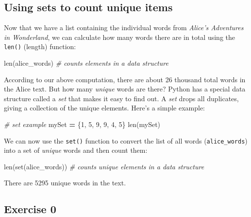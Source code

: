 \documentclass[]{book}
\newenvironment{Shaded}{\begin{snugshade}}{\end{snugshade}}
\newcommand{\BuiltInTok}[1]{#1}
\newcommand{\CommentTok}[1]{\textcolor[rgb]{0.56,0.35,0.01}{\textit{#1}}}
\newcommand{\DecValTok}[1]{\textcolor[rgb]{0.00,0.00,0.81}{#1}}
\newcommand{\NormalTok}[1]{#1}
\newcommand{\OperatorTok}[1]{\textcolor[rgb]{0.81,0.36,0.00}{\textbf{#1}}}
\begin{document}
\hypertarget{using-sets-to-count-unique-items}{%
\subsection{Using sets to count unique items}\label{using-sets-to-count-unique-items}}

Now that we have a list containing the individual words from \emph{Alice's Adventures in Wonderland}, we can calculate how many words there are in total using the \texttt{len()} (length) function:

\begin{Shaded}
\begin{Highlighting}[]
\BuiltInTok{len}\NormalTok{(alice_words) }\CommentTok{# counts elements in a data structure}
\end{Highlighting}
\end{Shaded}

According to our above computation, there are about 26 thousand total words in the Alice text. But how many \emph{unique} words are there? Python has a special data structure called a \emph{set} that makes it easy to find out. A \emph{set} drops all duplicates, giving a collection of the unique elements. Here's a simple example:

\begin{Shaded}
\begin{Highlighting}[]
\CommentTok{# set example}
\NormalTok{mySet }\OperatorTok{=}\NormalTok{ \{}\DecValTok{1}\NormalTok{, }\DecValTok{5}\NormalTok{, }\DecValTok{9}\NormalTok{, }\DecValTok{9}\NormalTok{, }\DecValTok{4}\NormalTok{, }\DecValTok{5}\NormalTok{\}}
\BuiltInTok{len}\NormalTok{(mySet)}
\end{Highlighting}
\end{Shaded}

We can now use the \texttt{set()} function to convert the list of all words (\texttt{alice\_words}) into a set of \emph{unique} words and then count them:

\begin{Shaded}
\begin{Highlighting}[]
\BuiltInTok{len}\NormalTok{(}\BuiltInTok{set}\NormalTok{(alice_words)) }\CommentTok{# counts unique elements in a data structure}
\end{Highlighting}
\end{Shaded}

There are 5295 unique words in the text.

\hypertarget{exercise-0-3}{%
\subsection{Exercise 0}\label{exercise-0-3}}
\end{document}
